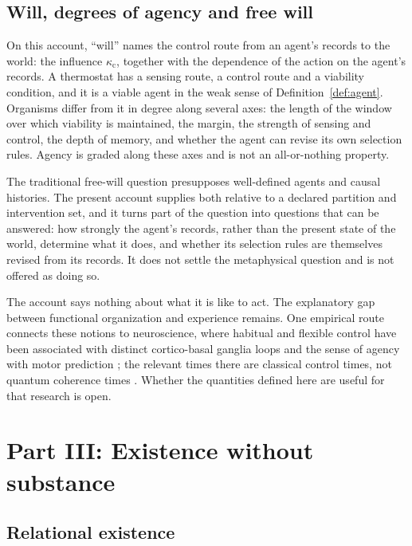 \documentclass[11pt,a4paper]{article}
\begin{document}
\subsection{Will, degrees of agency and free will}

On this account, ``will'' names the control route from an agent's records to the world: the influence $\kappa_{\mathrm c}$, together with the dependence of the action on the agent's records. A thermostat has a sensing route, a control route and a viability condition, and it is a viable agent in the weak sense of Definition~\ref{def:agent}. Organisms differ from it in degree along several axes: the length of the window over which viability is maintained, the margin, the strength of sensing and control, the depth of memory, and whether the agent can revise its own selection rules. Agency is graded along these axes and is not an all-or-nothing property.

The traditional free-will question presupposes well-defined agents and causal histories. The present account supplies both relative to a declared partition and intervention set, and it turns part of the question into questions that can be answered: how strongly the agent's records, rather than the present state of the world, determine what it does, and whether its selection rules are themselves revised from its records. It does not settle the metaphysical question and is not offered as doing so.

The account says nothing about what it is like to act. The explanatory gap between functional organization and experience \cite{Levine1983,Chalmers1996} remains. One empirical route connects these notions to neuroscience, where habitual and flexible control have been associated with distinct cortico-basal ganglia loops \cite{Graybiel2008,Yin2006} and the sense of agency with motor prediction \cite{Haggard2005}; the relevant times there are classical control times, not quantum coherence times \cite{Tegmark2000}. Whether the quantities defined here are useful for that research is open.

\section{Part III: Existence without substance}
\label{sec:existence}

\subsection{Relational existence}
\end{document}
